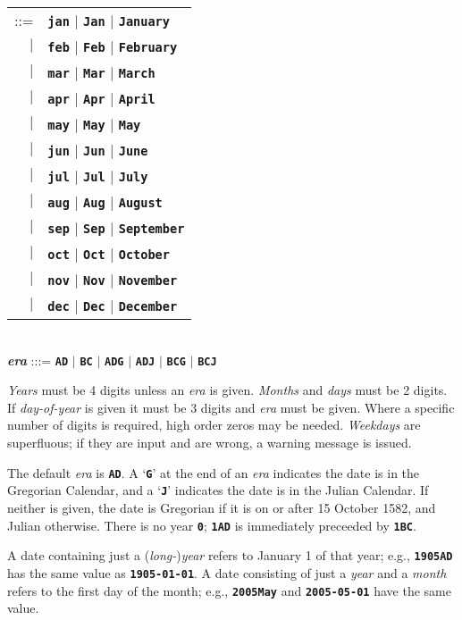 \documentclass[12pt]{article}
\makeatletter
\newcommand{\TT}[1]{{\tt \bfseries #1}}
\newcommand{\emkey}[1]{{\bf \em #1}\index{#1@{\em #1}}}
\newenvironment{indpar}[1][0.3in]%
	{\begin{list}{}%
		     {\setlength{\itemsep}{0in}%
		      \setlength{\topsep}{0in}%
		      \setlength{\parsep}{1ex}%
		      \setlength{\labelwidth}{#1}%
		      \setlength{\leftmargin}{#1}%
		      \addtolength{\leftmargin}{\labelsep}}%
	 \item}%
	{\end{list}}
\makeatother
\begin{document}
\begin{indpar}
    \begin{tabular}[t]{rl}
    ::= & \TT{jan} $|$ \TT{Jan} $|$ \TT{January} \\
    $|$ & \TT{feb} $|$ \TT{Feb} $|$ \TT{February} \\
    $|$ & \TT{mar} $|$ \TT{Mar} $|$ \TT{March} \\
    $|$ & \TT{apr} $|$ \TT{Apr} $|$ \TT{April} \\
    $|$ & \TT{may} $|$ \TT{May} $|$ \TT{May} \\
    $|$ & \TT{jun} $|$ \TT{Jun} $|$ \TT{June} \\
    $|$ & \TT{jul} $|$ \TT{Jul} $|$ \TT{July} \\
    $|$ & \TT{aug} $|$ \TT{Aug} $|$ \TT{August} \\
    $|$ & \TT{sep} $|$ \TT{Sep} $|$ \TT{September} \\
    $|$ & \TT{oct} $|$ \TT{Oct} $|$ \TT{October} \\
    $|$ & \TT{nov} $|$ \TT{Nov} $|$ \TT{November} \\
    $|$ & \TT{dec} $|$ \TT{Dec} $|$ \TT{December} \\
    \end{tabular}
\\[1ex]
\emkey{era} :::=  \TT{AD} $|$ \TT{BC} $|$ \TT{ADG} $|$ \TT{ADJ}
                          $|$ \TT{BCG} $|$ \TT{BCJ}
\end{indpar}

{\em Years} must be 4 digits unless an {\em era} is given.
{\em Months} and {\em days} must be 2 digits.
If {\em day-of-year} is given it must be 3 digits and {\em era}
must be given.  Where a specific number of digits is required,
high order zeros may be needed.
{\em Weekdays} are superfluous; if they are input and are wrong,
a warning message is issued.

The default {\em era} is \TT{AD}.
A `\TT{G}' at the end of an {\em era} indicates the date is in the
Gregorian Calendar, and a `\TT{J}' indicates the date is in the Julian
Calendar.  If neither is given, the date is Gregorian if it is on
or after 15 October 1582, and Julian otherwise.
There is no year \TT{0}; \TT{1AD} is immediately preceeded
by \TT{1BC}.

A date containing just a ({\em long-}){\em year} refers to January 1 of that
year; e.g., \TT{1905AD} has the same value as \TT{1905-01-01}.
A date consisting of just a {\em year} and a {\em month}
refers to the first day of the month;
e.g., \TT{2005May} and
\TT{2005-05-01} have the same value.
\end{document}

